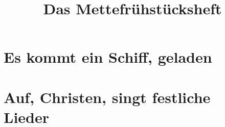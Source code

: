\documentclass[a5paper, landscape]{article}
\title{Das Mettefrühstücksheft}
\begin{document}
\maketitle

\tableofcontents
\section{Es kommt ein Schiff, geladen}
\section{Auf, Christen, singt festliche Lieder}
\end{document}
